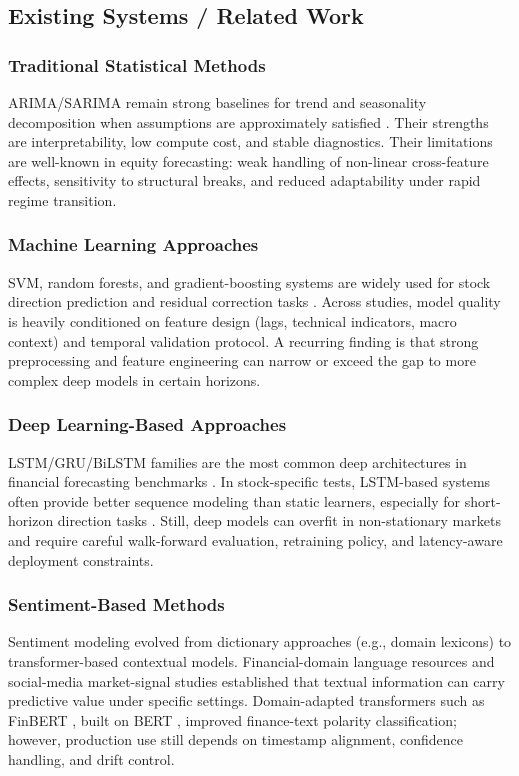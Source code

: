 \documentclass[12pt,a4paper]{article}
\begin{document}
\subsection{Existing Systems / Related Work}

\subsubsection{Traditional Statistical Methods}
ARIMA/SARIMA remain strong baselines for trend and seasonality decomposition when assumptions are approximately satisfied \cite{box2015}. Their strengths are interpretability, low compute cost, and stable diagnostics. Their limitations are well-known in equity forecasting: weak handling of non-linear cross-feature effects, sensitivity to structural breaks, and reduced adaptability under rapid regime transition.

\subsubsection{Machine Learning Approaches}
SVM, random forests, and gradient-boosting systems are widely used for stock direction prediction and residual correction tasks \cite{kim2003,patel2015,nti2020review}. Across studies, model quality is heavily conditioned on feature design (lags, technical indicators, macro context) and temporal validation protocol. A recurring finding is that strong preprocessing and feature engineering can narrow or exceed the gap to more complex deep models in certain horizons.

\subsubsection{Deep Learning-Based Approaches}
LSTM/GRU/BiLSTM families are the most common deep architectures in financial forecasting benchmarks \cite{sezer2020}. In stock-specific tests, LSTM-based systems often provide better sequence modeling than static learners, especially for short-horizon direction tasks \cite{fischer2018}. Still, deep models can overfit in non-stationary markets and require careful walk-forward evaluation, retraining policy, and latency-aware deployment constraints.

\subsubsection{Sentiment-Based Methods}
Sentiment modeling evolved from dictionary approaches (e.g., domain lexicons) to transformer-based contextual models. Financial-domain language resources \cite{loughran2011,malo2014} and social-media market-signal studies \cite{bollen2011} established that textual information can carry predictive value under specific settings. Domain-adapted transformers such as FinBERT \cite{araci2019}, built on BERT \cite{devlin2019}, improved finance-text polarity classification; however, production use still depends on timestamp alignment, confidence handling, and drift control.
\end{document}
